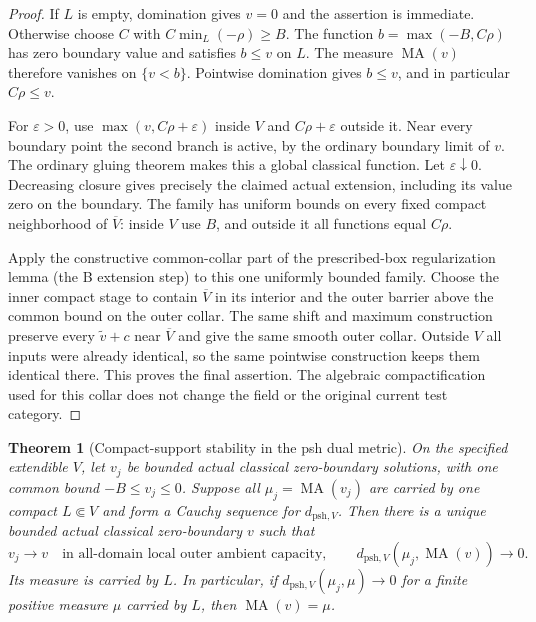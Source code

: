 \documentclass[11pt,a4paper]{article}
\numberwithin{equation}{section}
\newtheorem{theorem}{Theorem}[section]
\theoremstyle{definition}
\theoremstyle{remark}
\begin{document}
\begin{proof}
If $L$ is empty, domination gives $v=0$ and the assertion is
immediate.  Otherwise choose $C$ with
$C\min_L(-\rho)\geq B$.  The function
$b=\max(-B,C\rho)$ has zero boundary value and satisfies $b\leq v$
on $L$.  The measure $\operatorname{MA}(v)$ therefore vanishes on
$\{v<b\}$.  Pointwise domination gives $b\leq v$, and in particular
$C\rho\leq v$.

For $\varepsilon>0$, use $\max(v,C\rho+\varepsilon)$ inside $V$
and $C\rho+\varepsilon$ outside it.  Near every boundary point the
second branch is active, by the ordinary boundary limit of $v$.
The ordinary gluing theorem makes this a global classical function.
Let $\varepsilon\downarrow0$.  Decreasing closure gives precisely
the claimed actual extension, including its value zero on the
boundary.  The family has uniform bounds on every fixed compact
neighborhood of $\overline V$: inside $V$ use $B$, and outside it
all functions equal $C\rho$.

Apply the constructive common-collar part of the prescribed-box
regularization lemma (the B extension step) to this one uniformly
bounded family.  Choose the inner compact stage to contain
$\overline V$ in its interior and the outer barrier above the
common bound on the outer collar.  The same shift and maximum
construction preserve every $\widetilde v+c$ near $\overline V$
and give the same smooth outer collar.  Outside $V$ all inputs
were already identical, so the same pointwise construction keeps
them identical there.  This proves the final assertion.  The
algebraic compactification used for this collar does not change
the field or the original current test category.
\end{proof}

\begin{theorem}[Compact-support stability in the psh dual metric]
\label{thm:r3-psh-dual-dirichlet-stability}
On the specified extendible $V$, let $v_j$ be bounded actual
classical zero-boundary solutions, with one common bound
$-B\leq v_j\leq0$.  Suppose all $\mu_j=\operatorname{MA}(v_j)$
are carried by one compact $L\Subset V$ and form a Cauchy sequence
for $d_{\mathrm{psh},V}$.  Then there is a unique bounded actual
classical zero-boundary $v$ such that
\[
 v_j\longrightarrow v\quad\text{in all-domain local outer ambient
 capacity},\qquad
 d_{\mathrm{psh},V}(\mu_j,\operatorname{MA}(v))\longrightarrow0.
\]
Its measure is carried by $L$.  In particular, if
$d_{\mathrm{psh},V}(\mu_j,\mu)\to0$ for a finite positive measure
$\mu$ carried by $L$, then $\operatorname{MA}(v)=\mu$.
\end{theorem}
\end{document}
